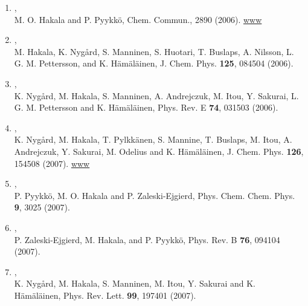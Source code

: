 \documentclass[12pt,a4]{report}
\begin{document}
\begin{enumerate}
\item{},\\
M. O. Hakala and P. Pyykk\"o, Chem. Commun., 2890 (2006). 
\href{http://pubs.rsc.org/en/content/articlehtml/2006/cc/b605757h}{www}

\item{},\\ M. Hakala, K. Nyg\aa rd,
S. Manninen, S. Huotari, T. Buslaps, A. Nilsson, L. G. M. Pettersson,
and K. H\"am\"al\"ainen,  J. Chem. Phys. {\bf 125}, 084504 (2006). %

\item{},\\ K. Nyg\aa rd, M. Hakala, S. Manninen,
A. Andrejczuk, M. Itou, Y. Sakurai, L. G. M. Pettersson
and K. H\"am\"al\"ainen,  
Phys. Rev. E {\bf 74}, 031503 (2006).

\item{},\\ K. Nyg\aa rd, M. Hakala, T. Pylkk{\"a}nen, S. Mannine, T. Buslaps, M. Itou, 
A. Andrejczuk, Y. Sakurai, M. Odelius and K. H\"am\"al\"ainen,  
J. Chem. Phys. {\bf 126}, 154508 (2007).
\href{http://dx.doi.org/10.1063/1.2723093}{www}

\item{},\\ 
P. Pyykk\"o, M. O. Hakala and P. Zaleski-Ejgierd, Phys. Chem. Chem. Phys. {\bf 9}, 3025 (2007).

\item{},\\P. Zaleski-Ejgierd, M. Hakala, and P. Pyykk\"o, 
Phys. Rev. B {\bf 76}, 094104 (2007). %

\item{},\\ K. Nyg\aa rd, M. Hakala, S. Manninen,
M. Itou, Y. Sakurai and K. H\"am\"al\"ainen,  
Phys. Rev. Lett. {\bf 99}, 197401 (2007).


\end{enumerate}
\end{document}
